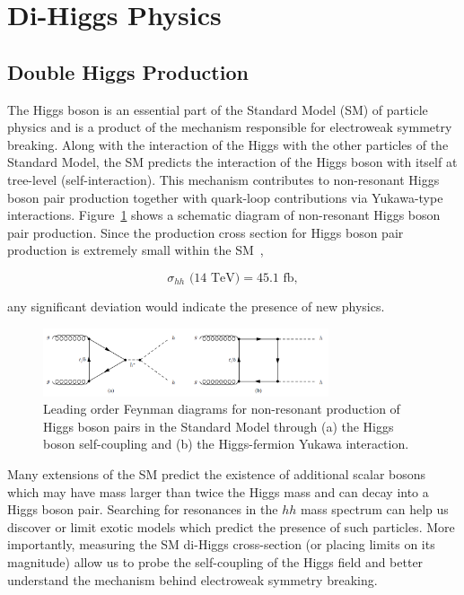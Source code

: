 \section{Di-Higgs Physics}
\subsection{Double Higgs Production}
\label{sec:physics}

The Higgs boson is an essential part of the Standard Model (SM) of particle physics and is a product of the mechanism responsible for electroweak symmetry breaking. Along with the interaction of the Higgs with the other particles of the Standard Model, the SM predicts the interaction of the Higgs boson with itself at tree-level (self-interaction). This mechanism contributes to non-resonant Higgs boson pair production together with quark-loop contributions via Yukawa-type interactions. Figure~\ref{fig:nr_hh_production} shows a schematic diagram of non-resonant Higgs boson pair production. Since the production cross section for Higgs boson pair production is extremely small within the SM~\cite{deFlorian:2016spz}, 

\begin{equation*}
\sigma_{hh}\text{ (14 TeV)} = 45.1 \text{ fb},
\end{equation*}

any significant deviation would indicate the presence of new physics.

\begin{figure}[!h] 
\begin{center}
\includegraphics*[width=0.75\textwidth] {dihiggsPhys/figures/nr-diHiggs-production.png}
\caption{Leading order Feynman diagrams for non-resonant production of Higgs
  boson pairs in the Standard Model through (a) the Higgs boson self-coupling
  and (b) the Higgs-fermion Yukawa interaction.} 
  \label{fig:nr_hh_production}
\end{center}
\end{figure}

Many extensions of the SM predict the existence of additional scalar bosons which may have mass larger than twice the Higgs mass and can decay into a Higgs boson pair. Searching for resonances in the $hh$ mass spectrum can help us discover or limit exotic models which predict the presence of such particles. More importantly, measuring the SM di-Higgs cross-section (or placing limits on its magnitude) allow us to probe the self-coupling of the Higgs field and better understand the mechanism behind electroweak symmetry breaking.

